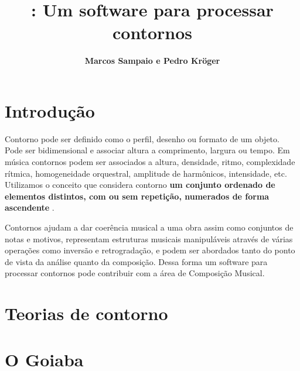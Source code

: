 \documentclass{sciposter}
\title{\goiaba{}: Um software para processar contornos}
\author{\textbf{Marcos Sampaio e Pedro Kröger}}
\institute{Genos---Grupo de pesquisa em computação musical}
\begin{document}



\maketitle

\begin{multicols}{3}

\section{Introdução}

Contorno pode ser definido como o perfil, desenho ou formato de um
objeto. Pode ser bidimensional e associar altura a comprimento,
largura ou tempo. Em música contornos podem ser associados a altura,
densidade, ritmo, complexidade rítmica, homogeneidade orquestral,
amplitude de harmônicos, intensidade, etc. Utilizamos o conceito que
considera contorno \textbf{um conjunto ordenado de elementos
  distintos, com ou sem repetição, numerados de forma ascendente}
\cite[p. 206]{morris93:directions}.

Contornos ajudam a dar coerência musical a uma obra assim como
conjuntos de notas e motivos, representam estruturas musicais
manipuláveis através de várias operações como inversão e
retrogradação, e podem ser abordados tanto do ponto de vista da
análise quanto da composição. Dessa forma um software para processar
contornos pode contribuir com a área de Composição Musical.

\section{Teorias de contorno}

\section{O Goiaba}

\end{multicols}
\end{document}
